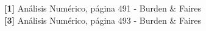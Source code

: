 \textbf{[1]} An\'alisis Num\'erico, p\'agina 491 - Burden \& Faires \\

\textbf{[3]} An\'alisis Num\'erico, p\'agina 493 - Burden \& Faires